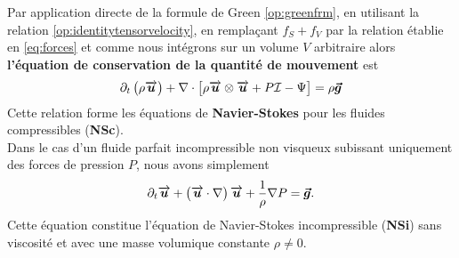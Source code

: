 \begin{refe}
Par application directe de la formule de Green \eqref{op:greenfrm}, en utilisant la relation \eqref{op:identitytensorvelocity}, en remplaçant $f_S+f_V$ par la relation établie en \eqref{eq:forces} et comme nous intégrons sur un volume $V$ arbitraire alors \textbf{l'équation de conservation de la quantité de mouvement} est 
\begin{equation}
	\partial_t \left(\rho\overrightarrow{\boldsymbol{u}}\right) + \nabla \cdot \left[ \rho \overrightarrow{\boldsymbol{u}} \otimes \overrightarrow{\boldsymbol{u}} +P\mathcal{I} - \Psi\right]  = \rho \boldsymbol{\vec{g}} \label{eq:NSC}
\end{equation}
Cette relation forme les équations de \textbf{Navier-Stokes} pour les fluides compressibles (\textbf{NSc}).\\
Dans le cas d'un fluide parfait incompressible non visqueux subissant uniquement des forces de pression $P$, nous avons simplement
\begin{equation}
	\partial_t \overrightarrow{\boldsymbol{u}} + \left(\overrightarrow{\boldsymbol{u}} \cdot \nabla \right)\overrightarrow{\boldsymbol{u}} + \frac{1}{\rho} \nabla P = \boldsymbol{\vec{g}}. \label{eq:NSI}
\end{equation}
Cette équation constitue l'équation de Navier-Stokes incompressible (\textbf{NSi}) sans viscosité et avec une masse volumique constante $\rho\neq 0$.
\end{refe}

